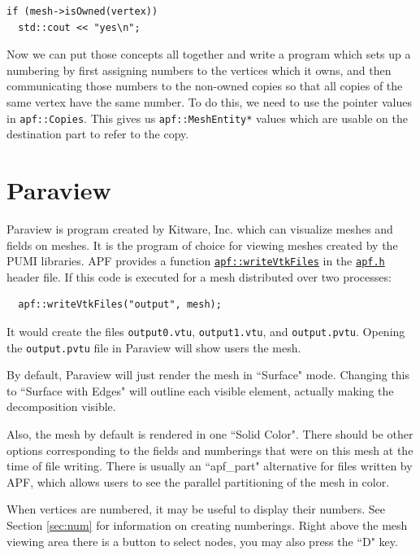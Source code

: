 \documentclass{article}
\begin{document}
\begin{lstlisting}
if (mesh->isOwned(vertex))
  std::cout << "yes\n";
\end{lstlisting}

Now we can put those concepts all together and write a program
which sets up a numbering by first assigning numbers to
the vertices which it owns, and then communicating those
numbers to the non-owned copies so that all copies
of the same vertex have the same number.
To do this, we need to use the pointer values in \texttt{apf::Copies}.
This gives us \texttt{apf::MeshEntity*} values which are usable
on the destination part to refer to the copy.



\appendix

\section{Paraview}
\label{sec:paraview}

Paraview is program created by Kitware, Inc. which can visualize meshes
and fields on meshes.
It is the program of choice for viewing meshes created by the PUMI libraries.
APF provides a function
\href{http://scorec.rpi.edu/~dibanez/core/namespaceapf.html#a060af76b0bb25bffe37dc7a20e121936}{\texttt{apf::writeVtkFiles}}
in the
\href{https://github.com/SCOREC/core/blob/master/apf/apf.h}{\texttt{apf.h}}
header file.
If this code is executed for a mesh distributed over two processes:

\begin{lstlisting}
  apf::writeVtkFiles("output", mesh);
\end{lstlisting}

It would create the files \texttt{output0.vtu}, \texttt{output1.vtu},
and \texttt{output.pvtu}.
Opening the \texttt{output.pvtu} file in Paraview will show users the
mesh.

By default, Paraview will just render the mesh in ``Surface" mode.
Changing this to ``Surface with Edges" will outline each visible element,
actually making the decomposition visible.

Also, the mesh by default is rendered in one ``Solid Color".
There should be other options corresponding to the fields and numberings
that were on this mesh at the time of file writing.
There is usually an ``apf\_part" alternative for files written by APF, which
allows users to see the parallel partitioning of the mesh in color.

When vertices are numbered, it may be useful to display their numbers.
See Section \ref{sec:num} for information on creating numberings.
Right above the mesh viewing area there is a button to select nodes,
you may also press the ``D" key.
\end{document}
